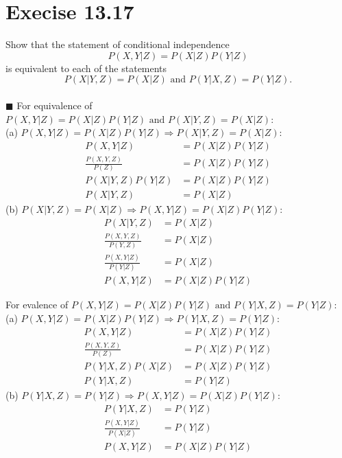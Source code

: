 \documentclass{article}
\newcommand{\solution}[1]{~\\ $\blacksquare$ \sffamily\upshape\selectfont #1
\normalfont ~\\~ }
\begin{document}
\section{Execise 13.17}
Show that the statement of conditional independence
\[ P(X,Y|Z)=P(X|Z)P(Y|Z) \]
is equivalent to each of the statements
\[ P(X|Y,Z)=P(X|Z) \mbox{ and } P(Y|X,Z)=P(Y|Z). \]
\solution{
  For equivalence of $P(X,Y|Z)=P(X|Z)P(Y|Z) \mbox{ and }
  P(X|Y,Z)=P(X|Z)$:  \\  
  (a) $P(X,Y|Z)=P(X|Z)P(Y|Z) \Longrightarrow P(X|Y,Z)=P(X|Z)$:
  \begin{align*}
    P(X,Y|Z) & = P(X|Z)P(Y|Z) \\ 
    \frac{P(X,Y,Z)}{P(Z)} & = P(X|Z)P(Y|Z) \\
    P(X|Y,Z)P(Y|Z) & = P(X|Z)P(Y|Z) \\
    P(X|Y,Z) & = P(X|Z)
  \end{align*}
  (b) $P(X|Y,Z)=P(X|Z) \Longrightarrow P(X,Y|Z)=P(X|Z)P(Y|Z)$: 
  \begin{align*}
    P(X|Y,Z) & = P(X|Z) \\ 
    \frac{P(X,Y,Z)}{P(Y,Z)} & = P(X|Z) \\
    \frac{P(X,Y|Z)}{P(Y|Z)} & = P(X|Z) \\ 
    P(X,Y|Z) & = P(X|Z)P(Y|Z)
  \end{align*}
  
  For evalence of $P(X,Y|Z)=P(X|Z)P(Y|Z) \mbox{ and }
  P(Y|X,Z)=P(Y|Z)$: \\   
  (a) $P(X,Y|Z)=P(X|Z)P(Y|Z) \Longrightarrow P(Y|X,Z)=P(Y|Z)$:  
  \begin{align*}
    P(X,Y|Z) & = P(X|Z)P(Y|Z) \\
    \frac{P(X,Y,Z)}{P(Z)} & = P(X|Z)P(Y|Z) \\
    P(Y|X,Z)P(X|Z) & = P(X|Z)P(Y|Z) \\
    P(Y|X,Z) & = P(Y|Z) 
  \end{align*}
  (b) $P(Y|X,Z)=P(Y|Z) \Longrightarrow P(X,Y|Z)=P(X|Z)P(Y|Z)$:  
  \begin{align*}
    P(Y|X,Z) & = P(Y|Z) \\
    \frac{P(X,Y|Z)}{P(X|Z)} & = P(Y|Z) \\
    P(X,Y|Z) & = P(X|Z)P(Y|Z) 
  \end{align*}
}
\end{document}
